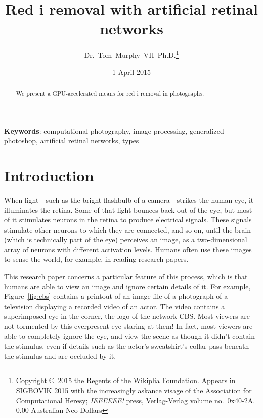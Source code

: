 \documentclass[twocolumn]{article}
\begin{document}
 

\title{Red i removal with artificial retinal networks}
\author{Dr.~Tom~Murphy~VII~Ph.D.\thanks{
Copyright \copyright\ 2015 the Regents of the Wikiplia
Foundation. Appears in SIGBOVIK 2015 with the increasingly askance visage of the
Association for Computational Heresy; {\em IEEEEEE!} press,
Verlag-Verlag volume no.~0x40-2A.
0.00 Australian Neo-Dollars}
}

\renewcommand\>{$>$}
\newcommand\<{$<$}

\date{1 April 2015}

\maketitle

\begin{abstract}
We present a GPU-accelerated means for red i removal in photographs.
\end{abstract}

\vspace{1em}
{\noindent \small {\bf Keywords}:
  computational photography, image processing, generalized photoshop, artificial retinal networks, types
}

\section{Introduction}

When light---such as the bright flashbulb of a camera---strikes the
human eye, it illuminates the retina. Some of that light bounces back
out of the eye, but most of it stimulates neurons in the retina to
produce electrical signals. These signals stimulate other neurons to
which they are connected, and so on, until the brain (which is
technically part of the eye) perceives an image, as a two-dimensional
array of neurons with different activation levels. Humans often use
these images to sense the world, for example, in reading research papers.

This research paper concerns a particular feature of this process,
which is that humans are able to view an image and ignore certain
details of it. For example, Figure~\ref{fig:cbs} contains a printout
of an image file of a photograph of a television displaying a recorded
video of an actor. The video contains a superimposed eye in the
corner, the logo of the network CBS. Most viewers are not tormented by
this everpresent eye staring at them! In fact, most viewers are able
to completely ignore the eye, and view the scene as though it didn't
contain the stimulus, even if details such as the actor's sweatshirt's
collar pass beneath the stimulus and are occluded by it.
\end{document}
